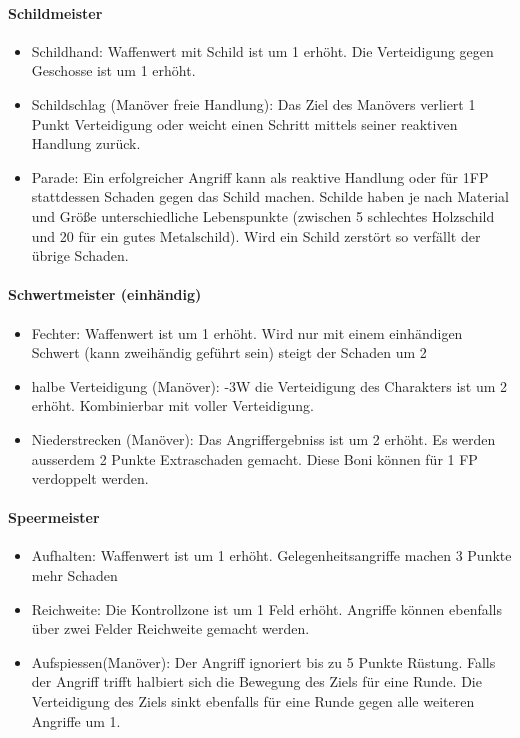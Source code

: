 \documentclass{article}
\begin{document}
\paragraph{Schildmeister}

\begin{itemize}
\item Schildhand: Waffenwert mit Schild ist um 1 erhöht. Die Verteidigung gegen Geschosse ist um 1 erhöht.
\item Schildschlag (Manöver freie Handlung): Das Ziel des Manövers verliert 1 Punkt Verteidigung oder weicht einen Schritt mittels seiner reaktiven Handlung zurück.
\item Parade: Ein erfolgreicher Angriff kann als reaktive Handlung oder für 1FP stattdessen Schaden gegen das Schild machen. Schilde haben je nach Material und Größe unterschiedliche Lebenspunkte (zwischen 5 schlechtes Holzschild und 20 für ein gutes Metalschild). Wird ein Schild zerstört so verfällt der übrige Schaden.
\end{itemize}

\paragraph{Schwertmeister (einhändig)}

\begin{itemize}
\item Fechter: Waffenwert ist um 1 erhöht. Wird nur mit einem einhändigen Schwert (kann zweihändig geführt sein) steigt der Schaden um 2
\item halbe Verteidigung (Manöver): -3W die Verteidigung des Charakters ist um 2 erhöht. Kombinierbar mit voller Verteidigung.
\item Niederstrecken (Manöver): Das Angriffergebniss ist um 2 erhöht. Es werden ausserdem 2 Punkte Extraschaden gemacht. Diese Boni können für 1 FP verdoppelt werden.
\end{itemize}

\paragraph{Speermeister}

\begin{itemize}
\item Aufhalten: Waffenwert ist um 1 erhöht. Gelegenheitsangriffe machen 3 Punkte mehr Schaden
\item Reichweite: Die Kontrollzone ist um 1 Feld erhöht. Angriffe können ebenfalls über zwei Felder Reichweite gemacht werden.
\item Aufspiessen(Manöver): Der Angriff ignoriert bis zu 5 Punkte Rüstung. Falls der Angriff trifft halbiert sich die Bewegung des Ziels für eine Runde. Die Verteidigung des Ziels sinkt ebenfalls für eine Runde gegen alle weiteren Angriffe um 1.
\end{itemize}
\end{document}
